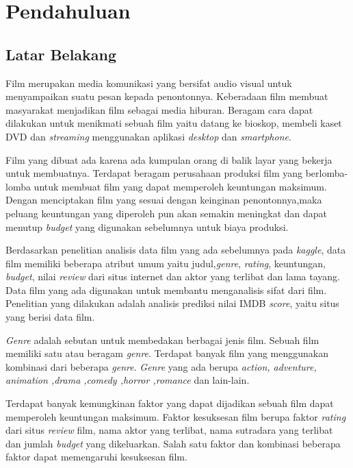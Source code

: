 \chapter{Pendahuluan}
\label{chap:intro}
   
\section{Latar Belakang}
\label{sec:label}

Film merupakan media komunikasi yang bersifat audio visual untuk menyampaikan suatu pesan kepada penontonnya. Keberadaan film membuat masyarakat menjadikan film sebagai media hiburan. Beragam cara dapat dilakukan untuk menikmati sebuah film yaitu datang ke bioskop, membeli kaset DVD dan \textit{streaming} menggunakan aplikasi \textit{desktop} dan \textit{smartphone}.

Film yang dibuat ada karena ada kumpulan orang di balik layar yang bekerja untuk membuatnya. Terdapat beragam perusahaan produksi film yang berlomba-lomba untuk membuat film yang dapat memperoleh keuntungan maksimum. Dengan menciptakan film yang sesuai dengan keinginan penontonnya,maka peluang keuntungan yang diperoleh pun akan semakin meningkat dan dapat menutup \textit{budget} yang digunakan sebelumnya untuk biaya produksi.
	
Berdasarkan penelitian analisis data film yang ada sebelumnya pada \textit{kaggle}, data film memiliki beberapa atribut umum yaitu judul,\textit{genre}, \textit{rating}, keuntungan,\textit{ budget}, nilai \textit{review} dari situs internet dan aktor yang terlibat dan lama tayang. Data film yang ada digunakan untuk membantu menganalisis sifat dari film. Penelitian yang dilakukan adalah analisis prediksi nilai IMDB \textit{score}, yaitu situs yang berisi data film. 	
	

\textit{Genre} adalah sebutan untuk membedakan berbagai jenis film. Sebuah film memiliki satu atau beragam \textit{genre}. Terdapat banyak film yang menggunakan kombinasi dari beberapa \textit{genre}.  \textit{Genre} yang ada berupa \textit{action, adventure, animation ,drama ,comedy ,horror ,romance} dan lain-lain. 

Terdapat banyak kemungkinan faktor yang dapat dijadikan sebuah film dapat memperoleh keuntungan maksimum. Faktor kesuksesan film berupa faktor \textit{rating} dari situs \textit{review} film, nama aktor yang terlibat, nama sutradara yang terlibat dan jumlah \textit{budget} yang dikeluarkan. Salah satu faktor dan kombinasi beberapa faktor dapat memengaruhi kesuksesan film.
	
